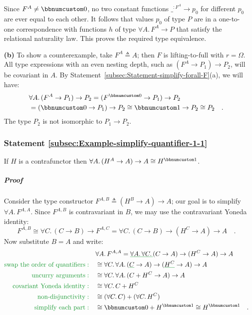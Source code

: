 Since $F^{A}\neq\bbnum 0$, no two constant functions $\_^{:F^{A}}\rightarrow p_{0}$
for different $p_{0}$ are ever equal to each other. It follows that
values $p_{0}$ of type $P$ are in a one-to-one correspondence with
functions $h$ of type $\forall A.\,F^{A}\rightarrow P$ that satisfy
the relational naturality law. This proves the required type equivalence.

\textbf{(b)} To show a counterexample, take $F^{A}\triangleq A$;
then $F$ is lifting-to-full with $r=\Omega$. All type expressions
with an even nesting depth, such as $(F^{A}\rightarrow P_{1})\rightarrow P_{2}$,
will be covariant in $A$. By Statement~\ref{subsec:Statement-simplify-forall-F}(a),
we will have:
\begin{align*}
 & \forall A.\,(F^{A}\rightarrow P_{1})\rightarrow P_{2}=(F^{\bbnum 0}\rightarrow P_{1})\rightarrow P_{2}\\
 & =(\bbnum 0\rightarrow P_{1})\rightarrow P_{2}\cong\bbnum 1\rightarrow P_{2}\cong P_{2}\quad.
\end{align*}
The type $P_{2}$ is not isomorphic to $P_{1}\rightarrow P_{2}$.

\subsubsection{Statement \label{subsec:Example-simplify-quantifier-1-1}\ref{subsec:Example-simplify-quantifier-1-1}}

If $H$ is a contrafunctor then $\forall A.\,(H^{A}\rightarrow A)\rightarrow A\cong H^{\bbnum 1}$.

\subparagraph{Proof}

Consider the type constructor $F^{A,B}\triangleq(H^{B}\rightarrow A)\rightarrow A$;
our goal is to simplify $\forall A.\,F^{A,A}$. Since $F^{A,B}$ is
contravariant in $B$, we may use the contravariant Yoneda identity:
\[
F^{A,B}\cong\forall C.\,(C\rightarrow B)\rightarrow F^{A,C}=\forall C.\,(C\rightarrow B)\rightarrow(H^{C}\rightarrow A)\rightarrow A\quad.
\]
Now substitute $B=A$ and write:
\begin{align*}
 & \forall A.\,F^{A,A}=\gunderline{\forall A.\,\forall C.\,}(C\rightarrow A)\rightarrow(H^{C}\rightarrow A)\rightarrow A\\
{\color{greenunder}\text{swap the order of quantifiers}:}\quad & \cong\forall C.\,\forall A.\,(\gunderline C\rightarrow A)\rightarrow(\gunderline{H^{C}}\rightarrow A)\rightarrow A\\
{\color{greenunder}\text{uncurry arguments}:}\quad & \cong\forall C.\,\forall A.\,(C+H^{C}\rightarrow A)\rightarrow A\\
{\color{greenunder}\text{covariant Yoneda identity}:}\quad & \cong\forall C.\,C+H^{C}\\
{\color{greenunder}\text{non-disjunctivity}:}\quad & \cong(\forall C.\,C)+(\forall C.\,H^{C})\\
{\color{greenunder}\text{simplify each part}:}\quad & \cong\bbnum 0+H^{\bbnum 1}\cong H^{\bbnum 1}\quad.
\end{align*}


